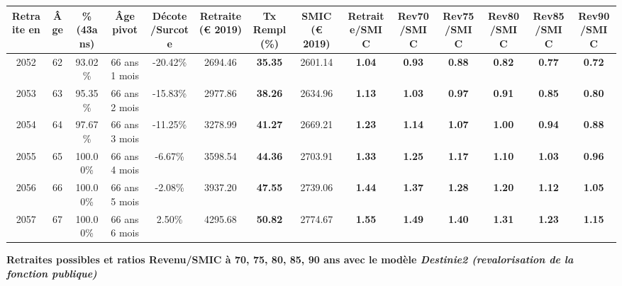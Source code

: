 \begin{adjustbox}{max width=\textwidth} 
\begin{tabular}[htb]{|c|c||c|c|c||c|c||c||c|c|c|c|c|c|} 
\hline 
 Retraite en &  Âge &  \%(43ans) &  Âge pivot &  Décote/Surcote &  Retraite (\euro{} 2019) &  Tx Rempl(\%) &  SMIC (\euro{} 2019) &  Retraite/SMIC &  Rev70/SMIC &  Rev75/SMIC &  Rev80/SMIC &  Rev85/SMIC &  Rev90/SMIC \\ 
\hline \hline 
 2052 &  62 &  93.02\% &  66 ans 1 mois &  -20.42\% &  2694.46 &  {\bf 35.35} &  2601.14 &  {\bf 1.04} &  {\bf {\color{red} 0.93}} &  {\bf {\color{red} 0.88}} &  {\bf {\color{red} 0.82}} &  {\bf {\color{red} 0.77}} &  {\bf {\color{red} 0.72}} \\ 
\hline 
 2053 &  63 &  95.35\% &  66 ans 2 mois &  -15.83\% &  2977.86 &  {\bf 38.26} &  2634.96 &  {\bf 1.13} &  {\bf 1.03} &  {\bf {\color{red} 0.97}} &  {\bf {\color{red} 0.91}} &  {\bf {\color{red} 0.85}} &  {\bf {\color{red} 0.80}} \\ 
\hline 
 2054 &  64 &  97.67\% &  66 ans 3 mois &  -11.25\% &  3278.99 &  {\bf 41.27} &  2669.21 &  {\bf 1.23} &  {\bf 1.14} &  {\bf 1.07} &  {\bf {\color{red} 1.00}} &  {\bf {\color{red} 0.94}} &  {\bf {\color{red} 0.88}} \\ 
\hline 
 2055 &  65 &  100.00\% &  66 ans 4 mois &  -6.67\% &  3598.54 &  {\bf 44.36} &  2703.91 &  {\bf 1.33} &  {\bf 1.25} &  {\bf 1.17} &  {\bf 1.10} &  {\bf 1.03} &  {\bf {\color{red} 0.96}} \\ 
\hline 
 2056 &  66 &  100.00\% &  66 ans 5 mois &  -2.08\% &  3937.20 &  {\bf 47.55} &  2739.06 &  {\bf 1.44} &  {\bf 1.37} &  {\bf 1.28} &  {\bf 1.20} &  {\bf 1.12} &  {\bf 1.05} \\ 
\hline 
 2057 &  67 &  100.00\% &  66 ans 6 mois &  2.50\% &  4295.68 &  {\bf 50.82} &  2774.67 &  {\bf 1.55} &  {\bf 1.49} &  {\bf 1.40} &  {\bf 1.31} &  {\bf 1.23} &  {\bf 1.15} \\ 
\hline 
\hline 
\end{tabular} 
\end{adjustbox} 
 
 \vspace{0.1cm} 
{\bf \noindent Retraites possibles et ratios Revenu/SMIC à 70, 75, 80, 85, 90 ans avec le modèle \emph{Destinie2 (revalorisation de la fonction publique)}}  
 
